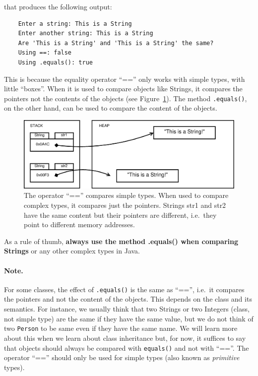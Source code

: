 that produces the following output: 

\begin{verbatim}
    Enter a string: This is a String
    Enter another string: This is a String
    Are 'This is a String' and 'This is a String' the same?
    Using ==: false
    Using .equals(): true
\end{verbatim}

This is because the equality operator ``=='' only works with simple
types, with little ``boxes''. When it is used to compare objects like
Strings, it compares the pointers not the contents of the objects (see
Figure~\ref{fig:equals}). The
method \verb+.equals()+, on the other hand, can be used to compare the
content of the objects. 

\begin{figure}[bthp]
  \centering
  \includegraphics[width=\textwidth]{gfx/variables-string-equals}
  \caption{The operator ``=='' compares simple types. When used to
    compare complex types, it compares just the pointers. Strings str1
  and str2 have the same content but their pointers are different,
  i.e.~they point to different memory addresses.} 
  \label{fig:equals}
\end{figure}

As a rule of thumb, \textbf{always use the method .equals()
  when comparing Strings} or any other complex types in Java.

\paragraph{Note.}
\label{sec:notre}

For some classes, the effect of \verb+.equals()+ is the same as
``=='', i.e.~it compares the pointers and not the content of the
objects. This depends on the class and its semantics. For instance,
we usually think that two Strings or two Integers (class, not simple
type) are the same if they have the same value, but we do not think
of two \verb+Person+ to be same even if they have the same name. We
will learn more about this when we learn about class inheritance but,
for now, it suffices to say that objects should always be compared
with \verb+equals()+ and not with ``==''. The operator ``=='' should
only be used for simple types (also known as \emph{primitive} types). 

